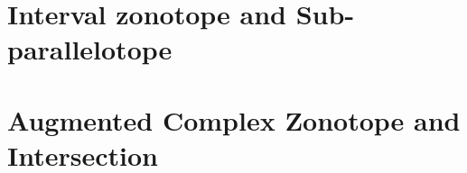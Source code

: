 

\section{Interval zonotope and Sub-parallelotope}
 

\section{Augmented Complex Zonotope and Intersection}
 



